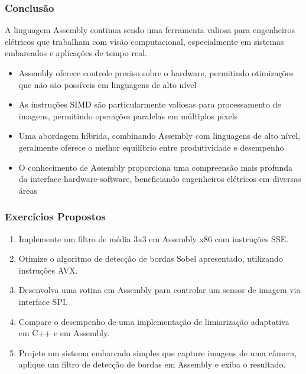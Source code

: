 \documentclass[11pt]{beamer}
\begin{document}
\begin{frame}
\frametitle{Conclusão}

A linguagem Assembly continua sendo uma ferramenta valiosa para engenheiros elétricos que trabalham com visão computacional, especialmente em sistemas embarcados e aplicações de tempo real.

\begin{itemize}
    \item Assembly oferece controle preciso sobre o hardware, permitindo otimizações que não são possíveis em linguagens de alto nível
    \item As instruções SIMD são particularmente valiosas para processamento de imagens, permitindo operações paralelas em múltiplos pixels
    \item Uma abordagem híbrida, combinando Assembly com linguagens de alto nível, geralmente oferece o melhor equilíbrio entre produtividade e desempenho
    \item O conhecimento de Assembly proporciona uma compreensão mais profunda da interface hardware-software, beneficiando engenheiros elétricos em diversas áreas
\end{itemize}

\end{frame}

\begin{frame}
\frametitle{Exercícios Propostos}

\begin{enumerate}
    \item Implemente um filtro de média 3x3 em Assembly x86 com instruções SSE.
    \item Otimize o algoritmo de detecção de bordas Sobel apresentado, utilizando instruções AVX.
    \item Desenvolva uma rotina em Assembly para controlar um sensor de imagem via interface SPI.
    \item Compare o desempenho de uma implementação de limiarização adaptativa em C++ e em Assembly.
    \item Projete um sistema embarcado simples que capture imagens de uma câmera, aplique um filtro de detecção de bordas em Assembly e exiba o resultado.
\end{enumerate}

\end{frame}
\end{document}
